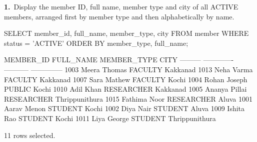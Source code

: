 \noindent\begin{minipage}{\linewidth}
\begingroup{}
{\fontsize{14}{17}\selectfont\textbf{1.}}\ Display the member ID, full name, member type and city of all ACTIVE members, arranged first by member type and then alphabetically by name.\par
\endgroup\vspace{12pt}


\begin{sqlcode}
SELECT member_id, full_name, member_type, city
FROM member
WHERE status = 'ACTIVE'
ORDER BY member_type, full_name;
\end{sqlcode}

\vspace{18pt}


\begin{sqlout}[fontsize=\small]
MEMBER_ID  FULL_NAME      MEMBER_TYPE  CITY          
---------  -------------  -----------  --------------
     1003  Meera Thomas   FACULTY      Kakkanad
     1013  Neha Varma     FACULTY      Kakkanad
     1007  Sara Mathew    FACULTY      Kochi
     1004  Rohan Joseph   PUBLIC       Kochi
     1010  Adil Khan      RESEARCHER   Kakkanad
     1005  Ananya Pillai  RESEARCHER   Thrippunithura
     1015  Fathima Noor   RESEARCHER   Aluva
     1001  Aarav Menon    STUDENT      Kochi
     1002  Diya Nair      STUDENT      Aluva
     1009  Ishita Rao     STUDENT      Kochi
     1011  Liya George    STUDENT      Thrippunithura

11 rows selected.
\end{sqlout}
\end{minipage}\par\vspace{24pt}


